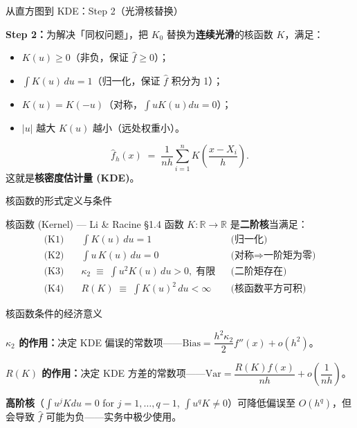 \documentclass[aspectratio=169, 10pt]{beamer}
\begin{document}
\begin{frame}{从直方图到 KDE：Step 2（光滑核替换）}

  \textbf{Step 2：}为解决「同权问题」，把 $K_0$ 替换为\textbf{连续光滑}的核函数 $K$，满足：
  \begin{itemize}
    \item $K(u)\geq 0$（非负，保证 $\hat f\geq 0$）；
    \item $\int K(u)\, du = 1$（归一化，保证 $\hat f$ 积分为 1）；
    \item $K(u) = K(-u)$（对称，$\int uK(u)du = 0$）；
    \item $|u|$ 越大 $K(u)$ 越小（远处权重小）。
  \end{itemize}

  \begin{highlightbox}
    \[
      \hat f_h(x) \;=\; \frac{1}{nh}\sum_{i=1}^n K\!\left(\frac{x-X_i}{h}\right).
    \]
    这就是\textbf{核密度估计量 (KDE)}。
  \end{highlightbox}

\end{frame}


\begin{frame}{核函数的形式定义与条件}

  \begin{definitionbox}{{核函数 (Kernel) — Li \& Racine §1.4}}
    函数 $K:\mathbb{R}\to\mathbb{R}$ 是\textbf{二阶核}当满足：
    \begin{align*}
      \text{(K1)} \quad & \int K(u)\, du = 1 && \text{(归一化)}\\
      \text{(K2)} \quad & \int u\, K(u)\, du = 0 && \text{(对称}\Rightarrow\text{一阶矩为零)}\\
      \text{(K3)} \quad & \kappa_2 \;\equiv\; \int u^2 K(u)\, du > 0,\; \text{有限} && \text{(二阶矩存在)}\\
      \text{(K4)} \quad & R(K) \;\equiv\; \int K(u)^2\, du < \infty && \text{(核函数平方可积)}
    \end{align*}
  \end{definitionbox}

\end{frame}


\begin{frame}{核函数条件的经济意义}

  \begin{keybox}
    \textbf{$\kappa_2$ 的作用：}决定 KDE 偏误的常数项——$\text{Bias} = \dfrac{h^2\kappa_2}{2}f''(x) + o(h^2)$。

    \textbf{$R(K)$ 的作用：}决定 KDE 方差的常数项——$\text{Var} = \dfrac{R(K)f(x)}{nh} + o\!\left(\dfrac{1}{nh}\right)$。

    \textbf{高阶核}（$\int u^j K du=0$ for $j=1,\ldots,q-1$, $\int u^q K\neq 0$）可降低偏误至 $O(h^q)$，但会导致 $\hat f$ 可能为负——实务中极少使用。
  \end{keybox}

\end{frame}
\end{document}
